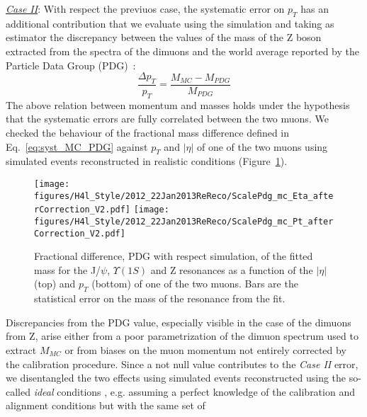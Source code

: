 \underline{\sl Case II}: With respect the previuos case, the
systematic error on $p_T$ has an additional contribution that we
evaluate using the simulation and taking as estimator the discrepancy
between the values of the mass of the Z boson extracted from the
spectra of the dimuons and the world average reported by the Particle
Data Group (PDG)~\cite{Beringer:1900zz}: 
\begin{equation}
  \frac{\Delta p_T}{p_T}=\frac{M_{MC}-M_{PDG}}{M_{PDG}}
  \label{eq:syst_MC_PDG}
\end{equation}
The above relation between momentum
and masses holds under the hypothesis that the systematic errors are fully correlated between the two muons. 
We checked the behaviour of the fractional mass difference defined
in Eq.~\ref{eq:syst_MC_PDG} against $p_T$ and $|\eta|$ of one of the two
muons using simulated events reconstructed in realistic conditions
(Figure~\ref{fig:ScalePDGMC_8TeV}). 
\begin{figure}[hbtp]  
\begin{center}
\texttt{[image: figures/H4l\_Style/2012\_22Jan2013ReReco/ScalePdg\_mc\_Eta\_afterCorrection\_V2.pdf]}
\texttt{[image: figures/H4l\_Style/2012\_22Jan2013ReReco/ScalePdg\_mc\_Pt\_afterCorrection\_V2.pdf]} 
 \hspace{1cm} 
   \caption{Fractional difference, PDG with respect simulation, of the fitted mass for the J/$\psi$,
     $\Upsilon(1S)$ and Z resonances as a function of the $|\eta|$ (top)
     and $p_T$ (bottom) of one of the two muons. Bars are the
     statistical error on the mass of the resonance from the fit.
   \label{fig:ScalePDGMC_8TeV}}
 \end{center}
\end{figure} 
Discrepancies from the PDG value, especially visible in the case of
the dimuons from Z, arise either
from a poor parametrization of the dimuon spectrum used to extract $M_{MC}$ or from biases on the muon momentum not entirely corrected by the
calibration procedure.
Since a not null value contributes 
to the {\sl Case II} error,
we disentangled the two effects using
simulated events reconstructed using the so-called {\sl ideal}
conditions , e.g. assuming a perfect knowledge of the
calibration and alignment conditions but with the same set of
